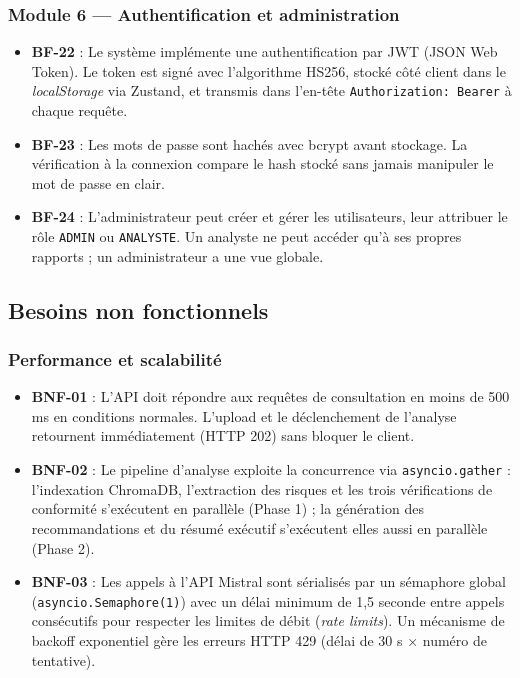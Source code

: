 \subsubsection*{Module 6 — Authentification et administration}

\begin{itemize}
  \item \textbf{BF-22} : Le système implémente une authentification par
    JWT (JSON Web Token). Le token est signé avec l'algorithme HS256,
    stocké côté client dans le \textit{localStorage} via Zustand, et
    transmis dans l'en-tête \texttt{Authorization: Bearer} à chaque
    requête.
  \item \textbf{BF-23} : Les mots de passe sont hachés avec bcrypt avant
    stockage. La vérification à la connexion compare le hash stocké sans
    jamais manipuler le mot de passe en clair.
  \item \textbf{BF-24} : L'administrateur peut créer et gérer les
    utilisateurs, leur attribuer le rôle \texttt{ADMIN} ou
    \texttt{ANALYSTE}. Un analyste ne peut accéder qu'à ses propres
    rapports ; un administrateur a une vue globale.
\end{itemize}

\subsection{Besoins non fonctionnels}

\subsubsection*{Performance et scalabilité}

\begin{itemize}
  \item \textbf{BNF-01} : L'API doit répondre aux requêtes de consultation
    en moins de 500 ms en conditions normales. L'upload et le déclenchement
    de l'analyse retournent immédiatement (HTTP 202) sans bloquer le
    client.
  \item \textbf{BNF-02} : Le pipeline d'analyse exploite la concurrence
    via \texttt{asyncio.gather} : l'indexation ChromaDB, l'extraction
    des risques et les trois vérifications de conformité s'exécutent en
    parallèle (Phase 1) ; la génération des recommandations et du résumé
    exécutif s'exécutent elles aussi en parallèle (Phase 2).
  \item \textbf{BNF-03} : Les appels à l'API Mistral sont sérialisés par
    un sémaphore global (\texttt{asyncio.Semaphore(1)}) avec un délai
    minimum de 1,5 seconde entre appels consécutifs pour respecter les
    limites de débit (\textit{rate limits}). Un mécanisme de backoff
    exponentiel gère les erreurs HTTP 429 (délai de 30 s × numéro
    de tentative).
\end{itemize}

